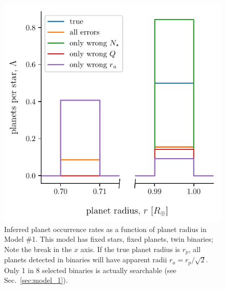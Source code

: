 \newpage
\begin{figure}
    \begin{center}
        \includegraphics[width=\textwidth]{figures/errcases_rate_density_vs_radius_model_1_brokenx.pdf}
    \end{center}
    \caption{
    Inferred planet occurrence rates as a function of planet radius in Model 
    \#1.
    This model has fixed stars, fixed planets, twin binaries;
    Note the break in the $x$ axis.
    If the true planet radius is $r_p$, all planets 
    detected in binaries will have apparent radii $r_a = r_p/\sqrt{2}$.
    Only 1 in 8 selected binaries is actually searchable (see 
    Sec.~\ref{sec:model_1}).
    }
    \label{fig:errcases_model_1}
\end{figure}

